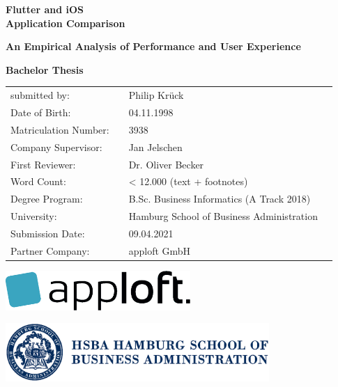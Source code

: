 \thispagestyle{empty}                  %


\begin{center}                         

\textbf{\Huge Flutter and iOS\\ Application Comparison}

\textbf{\large An Empirical Analysis of Performance and User Experience}

\vspace{5cm}

\textbf{\huge Bachelor Thesis}

\vspace{2cm}



\large\centering\doublespacing
\hspace{1.3cm}\begin{tabular}{p{4.2cm}p{0.3cm} p{8.7cm}l}
submitted by: & & Philip Krück\\
Date of Birth: & & 04.11.1998\\
Matriculation Number: & & 3938\\
Company Supervisor: & & Jan Jelschen\\
First Reviewer: & & Dr. Oliver Becker\\
Word Count: & & < 12.000 (text + footnotes) \\
Degree Program: & & B.Sc. Business Informatics (A Track 2018)\\
University: & & Hamburg School of Business Administration\\
Submission Date: & & 09.04.2021\\
Partner Company: & & apploft GmbH\\
\end{tabular}


\vspace{2cm}

\includegraphics[width=7cm]{images/apploft.eps} %

\vspace{0.5cm}

\includegraphics[width=10cm]{images/hsba.eps} %

\end{center}
